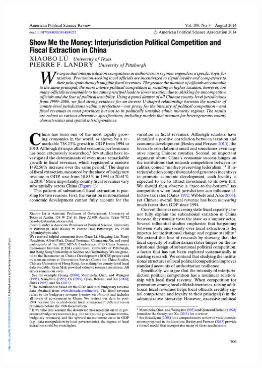 \documentclass[
  10pt,
  ignorenonframetext,
]{beamer}
\begin{document}
\begin{frame}
\begin{center}\includegraphics[width=0.9\linewidth]{Figs/Examples/lu_cover} \end{center}
\end{frame}
\end{document}
